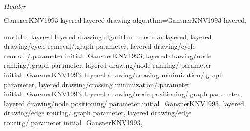%
%
%

\ProvidesFileRCS[v\pgfversion] $Header$





%
% 




%
%



%
%
%
\pgfgddeclarealgorithmkey
  {GansnerKNV1993 layered}
  {layered drawing}
  {
    algorithm=GansnerKNV1993 layered,
  }


%
%
\pgfgddeclarealgorithmkey
  {modular layered}
  {layered drawing}
  {
    algorithm=modular layered,
    layered drawing/cycle removal/.graph parameter,
    layered drawing/cycle removal/.parameter initial=GansnerKNV1993,
    layered drawing/node ranking/.graph parameter,
    layered drawing/node ranking/.parameter initial=GansnerKNV1993,
    layered drawing/crossing minimization/.graph parameter,
    layered drawing/crossing minimization/.parameter initial=GansnerKNV1993,
    layered drawing/node positioning/.graph parameter,
    layered drawing/node positioning/.parameter initial=GansnerKNV1993,
    layered drawing/edge routing/.graph parameter,
    layered drawing/edge routing/.parameter initial=GansnerKNV1993,
  }

\endinput

